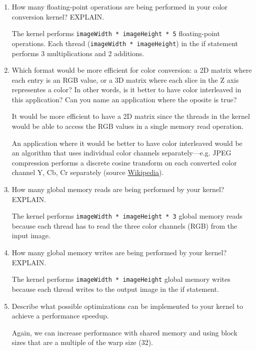 \documentclass[../main.tex]{subfiles}
\begin{document}
\begin{enumerate}
    \item How many floating-point operations are being performed in your color
    conversion kernel? EXPLAIN.

    The kernel performs \texttt{imageWidth * imageHeight * 5} floating-point operations.
    Each thread (\texttt{imageWidth * imageHeight}) in the if statement performs
    3 multiplications and 2 additions.

    \item Which format would be more eﬃcient for color conversion: a 2D matrix
    where each entry is an RGB value, or a 3D matrix where each slice in
    the Z axis representes a color? In other words, is it better to have color
    interleaved in this application? Can you name an application where the
    oposite is true?

    It would be more efficient to have a 2D matrix since the threads in the kernel
    would be able to access the RGB values in a single memory read operation.

    An application where it would be better to have color interleaved would be
    an algorithm that uses individual color channels separately---e.g. JPEG compression performs 
    a discrete cosine transform on each converted color channel Y, Cb, Cr separately
    (source \href{https://en.wikipedia.org/wiki/JPEG#JPEG_codec_example}{Wikipedia}).

    \item How many global memory reads are being performed by your kernel?
    EXPLAIN.

    The kernel performs \texttt{imageWidth * imageHeight * 3} global memory reads because
    each thread has to read the three color channels (RGB) from the input image.

    \item How many global memory writes are being performed by your kernel?
    EXPLAIN.

    The kernel performs \texttt{imageWidth * imageHeight} global memory writes because
    each thread writes to the output image in the if statement.

    \item Describe what possible optimizations can be implemented to your kernel
    to achieve a performance speedup.

    Again, we can increase performance with shared memory and using block sizes that are
    a multiple of the warp size (32).


\end{enumerate}
\end{document}
